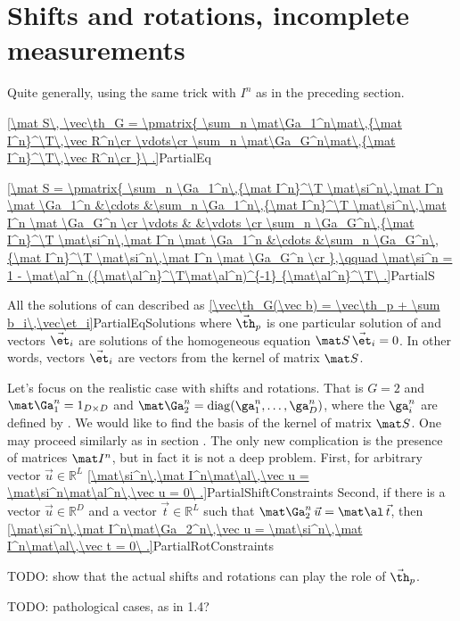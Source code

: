 \section{Shifts and rotations, incomplete measurements}

Quite generally, using the same trick with $I^n$ as in the preceding section.

\eqref{\mat S\, \vec\th_G = \pmatrix{
\sum_n \mat\Ga_1^n\mat\,{\mat I^n}^\T\,\vec R^n\cr
\vdots\cr
\sum_n \mat\Ga_G^n\mat\,{\mat I^n}^\T\,\vec R^n\cr
}\ .}{PartialEq}

\eqref{\mat S = \pmatrix{
\sum_n \Ga_1^n\,{\mat I^n}^\T \mat\si^n\,\mat I^n \mat \Ga_1^n	&\cdots	&\sum_n \Ga_1^n\,{\mat I^n}^\T \mat\si^n\,\mat I^n \mat \Ga_G^n	\cr
\vdots								&		&\vdots									\cr
\sum_n \Ga_G^n\,{\mat I^n}^\T \mat\si^n\,\mat I^n \mat \Ga_1^n	&\cdots	&\sum_n \Ga_G^n\,{\mat I^n}^\T \mat\si^n\,\mat I^n \mat \Ga_G^n	\cr
},\qquad
\mat\si^n = 1 - \mat\al^n ({\mat\al^n}^\T\mat\al^n)^{-1} {\mat\al^n}^\T\ .}{PartialS}

All the solutions of  can described as
\eqref{\vec\th_G(\vec b) = \vec\th_p + \sum b_i\,\vec\et_i}{PartialEqSolutions}
where $\vec\th_p$ is one particular solution of  and vectors $\vec\et_i$ are solutions of the homogeneous equation $\mat S\,\vec\et_i = 0$. In other words, vectors $\vec\et_i$ are vectors from the kernel of matrix $\mat S$.

Let's focus on the realistic case with shifts and rotations. That is $G = 2$ and $\mat\Ga_1^n = 1_{D\times D}$ and $\mat\Ga_2^n = {\rm diag}(\ga^n_1, \ldots, \ga_D^n)$, where the $\ga_i^n$ are defined by . We would like to find the basis of the kernel of matrix $\mat S$. One may proceed similarly as in section . The only new complication is the presence of matrices $\mat I^n$, but in fact it is not a deep problem. First, for arbitrary vector $\vec u\in\mathbb{R}^L$
\eqref{\mat\si^n\,\mat I^n\mat\al\,\vec u = \mat\si^n\mat\al^n\,\vec u = 0\ .}{PartialShiftConstraints}
Second, if there is a vector $\vec u\in\mathbb{R}^D$ and a vector $\vec t\in\mathbb{R}^L$ such that $\mat\Ga_2^n\,\vec u = \mat\al\,\vec t$, then
\eqref{\mat\si^n\,\mat I^n\mat\Ga_2^n\,\vec u = \mat\si^n\,\mat I^n\mat\al\,\vec t = 0\ .}{PartialRotConstraints}

TODO: show that the actual shifts and rotations can play the role of $\vec\th_p$.

TODO: pathological cases, as in 1.4?

\PrintReferences


